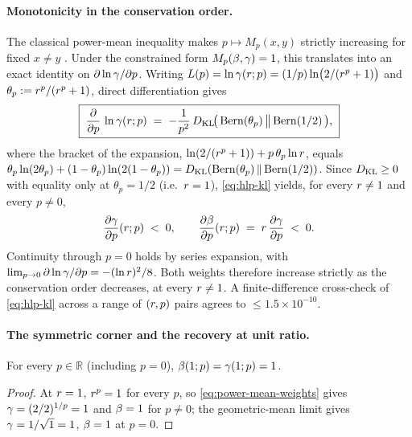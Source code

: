\paragraph{Monotonicity in the conservation order.}
The classical power-mean inequality makes $p \mapsto M_p(x, y)$ strictly
increasing for fixed $x \ne y$ \cite{HLP1934}. Under the constrained form
$M_p(\beta, \gamma) = 1$, this translates into an exact identity on
$\partial \ln \gamma / \partial p$. Writing
$L(p) = \ln \gamma(r; p) = (1/p)\ln\!\big(2/(r^p + 1)\big)$ and
$\theta_p := r^p / (r^p + 1)$, direct differentiation gives
\begin{equation}
  \boxed{\;
    \frac{\partial}{\partial p}\,\ln \gamma(r; p)
    \;=\;
    -\frac{1}{p^2}\,
    D_{\mathrm{KL}}\!\bigl(\,\mathrm{Bern}(\theta_p)\,\big\|\,
                    \mathrm{Bern}(1/2)\,\bigr),
  \;}
  \label{eq:hlp-kl}
\end{equation}
where the bracket of the expansion,
$\ln(2/(r^p + 1)) + p\,\theta_p \ln r$, equals
$\theta_p \ln(2\theta_p) + (1 - \theta_p)\ln(2(1 - \theta_p)) =
D_{\mathrm{KL}}(\mathrm{Bern}(\theta_p)\,\|\,\mathrm{Bern}(1/2))$. Since
$D_{\mathrm{KL}} \ge 0$ with equality only at $\theta_p = 1/2$ (i.e.\ $r = 1$),
\eqref{eq:hlp-kl} yields, for every $r \ne 1$ and every
$p \ne 0$,
\begin{equation}
  \frac{\partial \gamma}{\partial p}(r; p) \;<\; 0,
  \qquad
  \frac{\partial \beta}{\partial p}(r; p)
  \;=\; r\,\frac{\partial \gamma}{\partial p} \;<\; 0.
  \label{eq:mono-sign}
\end{equation}
Continuity through $p = 0$ holds by series expansion, with
$\lim_{p \to 0}\partial \ln \gamma / \partial p = -(\ln r)^2 / 8$.
Both weights therefore increase strictly as the conservation order
decreases, at every $r \ne 1$. A finite-difference cross-check of
\eqref{eq:hlp-kl} across a range of $(r, p)$ pairs agrees to
$\le 1.5 \times 10^{-10}$.

\paragraph{The symmetric corner and the recovery at unit ratio.}
\begin{proposition}
\label{prop:symmetric-corner}
For every $p \in \mathbb{R}$ (including $p = 0$),
$\beta(1; p) = \gamma(1; p) = 1$.
\end{proposition}

\begin{proof}
At $r = 1$, $r^p = 1$ for every $p$, so
\eqref{eq:power-mean-weights} gives $\gamma = (2/2)^{1/p} = 1$ and
$\beta = 1$ for $p \ne 0$; the geometric-mean limit gives
$\gamma = 1/\sqrt{1} = 1$, $\beta = 1$ at $p = 0$.
\end{proof}

